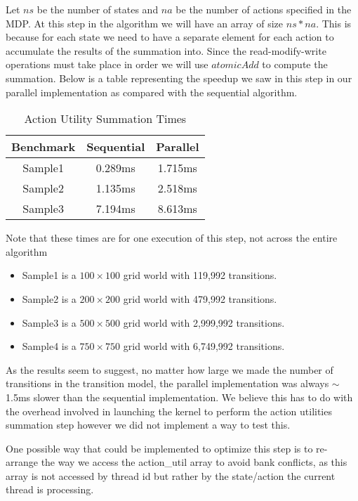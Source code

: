 \documentclass[letterpaper,twocolumn,10pt]{article}
\begin{document}
{Let $ns$ be the number of states and $na$ be the number of actions specified in the MDP. At this step in the algorithm we will have an array of size $ns * na$. This is because for each state we need to have a separate element for each action to accumulate the results of the summation into. Since the read-modify-write operations must take place in order we will use $atomicAdd$ to compute the summation. Below is a table representing the speedup we saw in this step in our parallel implementation as compared with the sequential algorithm.

\begin{table}[h!]
	\centering
	\caption{Action Utility Summation Times}
	\label{tab:table1}
	\begin{tabular}{ccc}
		\toprule
		Benchmark & Sequential & Parallel\\
		\midrule
		Sample1 & 0.289ms & 1.715ms\\
		Sample2 & 1.135ms & 2.518ms\\
		Sample3 & 7.194ms & 8.613ms\\
		\bottomrule
	\end{tabular}
\end{table}

\scriptsize
Note that these times are for one execution of this step, not across the entire algorithm
\normalsize

\begin{itemize}
	\item Sample1 is a $100\times100$ grid world with 119,992 transitions.
	\item Sample2 is a $200\times200$ grid world with 479,992 transitions.
	\item Sample3 is a $500\times500$ grid world with 2,999,992 transitions.
	\item Sample4 is a $750\times750$ grid world with 6,749,992 transitions.
\end{itemize}

As the results seem to suggest, no matter how large we made the number of transitions in the transition model, the parallel implementation was always $\sim$1.5ms slower than the sequential implementation. We believe this has to do with the overhead involved in launching the kernel to perform the action utilities summation step however we did not implement a way to test this.

One possible way that could be implemented to optimize this step is to re-arrange the way we access the action\_util array to avoid bank conflicts, as this array is not accessed by thread id but rather by the state/action the current thread is processing.

}
\end{document}
